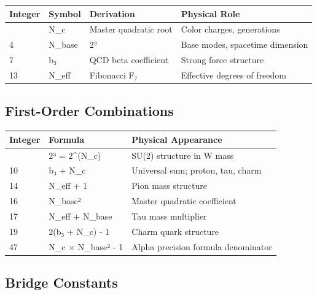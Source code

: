 \documentclass[
  11pt,
  letterpaper,
  twoside,
  openright]{book}
\begin{document}
\begin{longtable}[]{@{}llll@{}}
\toprule\noalign{}
Integer & Symbol & Derivation & Physical Role \\
\midrule\noalign{}
\endhead
\bottomrule\noalign{}
\endlastfoot
3 & N\_c & Master quadratic root & Color charges, generations \\
4 & N\_base & 2² & Base modes, spacetime dimension \\
7 & b₃ & QCD beta coefficient & Strong force structure \\
13 & N\_eff & Fibonacci F₇ & Effective degrees of freedom \\
\end{longtable}

\subsection{First-Order Combinations}\label{first-order-combinations}

\begin{longtable}[]{@{}lll@{}}
\toprule\noalign{}
Integer & Formula & Physical Appearance \\
\midrule\noalign{}
\endhead
\bottomrule\noalign{}
\endlastfoot
8 & 2³ = 2\^{}(N\_c) & SU(2) structure in W mass \\
10 & b₃ + N\_c & Universal sum; proton, tau, charm \\
14 & N\_eff + 1 & Pion mass structure \\
16 & N\_base² & Master quadratic coefficient \\
17 & N\_eff + N\_base & Tau mass multiplier \\
19 & 2(b₃ + N\_c) - 1 & Charm quark structure \\
47 & N\_c × N\_base² - 1 & Alpha precision formula denominator \\
\end{longtable}

\subsection{Bridge Constants}\label{bridge-constants}
\end{document}
